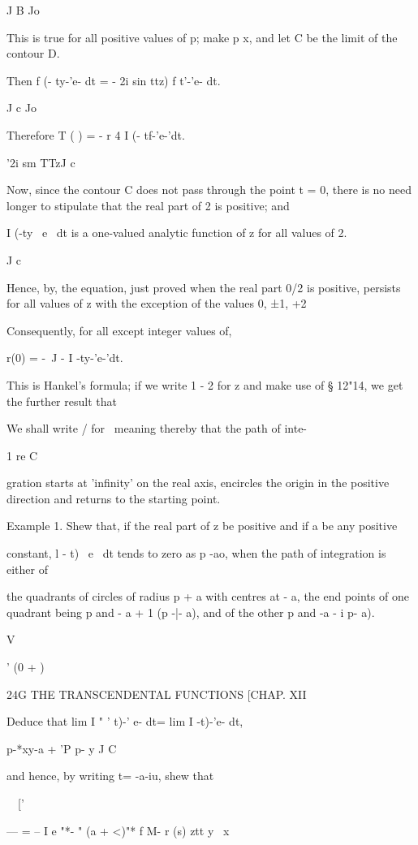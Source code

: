 J B Jo

This is true for all positive values of p; make p x, and let C be
the limit of the contour D.

Then f (- ty-'e- dt = - 2i sin ttz) f t'-'e- dt.

J c Jo

Therefore T ( ) = - r 4 I (- tf-'e-'dt.

'2i sm TTzJ c

Now, since the contour C does not pass through the point t = 0, there
is no need longer to stipulate that the real part of 2 is positive;
and

I (-ty~ e~ dt is a one-valued analytic function of z for all values of
2.

J c

Hence, by, the equation, just proved when the real part 0/2 is
positive, persists for all values of z with the exception of the
values 0, ±1, +2

Consequently, for all except integer values of,

r(0) = -\ J - I -ty-'e-'dt.

This is Hankel's formula; if we write 1 - 2 for z and make use of §
12"14, we get the further result that

We shall write / for \, meaning thereby that the path of inte-

1 re C

gration starts at 'infinity' on the real axis, encircles the origin in
the positive direction and returns to the starting point.

Example 1. Shew that, if the real part of z be positive and if a be
any positive

constant, l - t)~ e~ dt tends to zero as p -ao, when the path of
integration is either of

the quadrants of circles of radius p + a with centres at - a, the end
points of one quadrant being p and - a + 1 (p -|- a), and of the other
p and -a - i p- a).

V

' (0 + )

24G THE TRANSCENDENTAL FUNCTIONS [CHAP. XII

Deduce that lim I " ' t)-' e- dt= lim I -t)-'e- dt,

p-*xy-a + 'P p- y J C

and hence, by writing t= -a-iu, shew that

\ \ ['

--- = -- I e "*- " (a + <)"* f M- r (s) ztt y \ x

